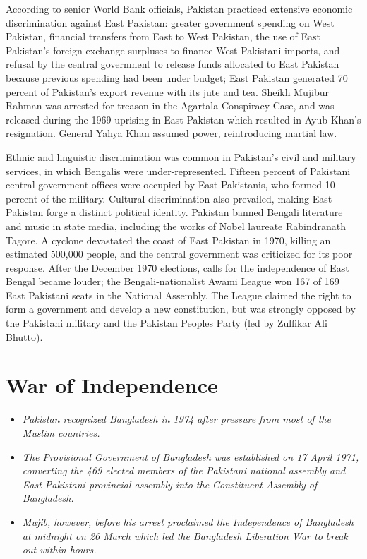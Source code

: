 According to senior World Bank officials, Pakistan practiced extensive
economic discrimination against East Pakistan: greater government
spending on West Pakistan, financial transfers from East to West
Pakistan, the use of East Pakistan's foreign-exchange surpluses to
finance West Pakistani imports, and refusal by the central government to
release funds allocated to East Pakistan because previous spending had
been under budget; East Pakistan generated 70 percent of Pakistan's
export revenue with its jute and tea. Sheikh Mujibur Rahman was arrested
for treason in the Agartala Conspiracy Case, and was released during the
1969 uprising in East Pakistan which resulted in Ayub Khan's
resignation. General Yahya Khan assumed power, reintroducing martial
law.

Ethnic and linguistic discrimination was common in Pakistan's civil and
military services, in which Bengalis were under-represented. Fifteen
percent of Pakistani central-government offices were occupied by East
Pakistanis, who formed 10 percent of the military. Cultural
discrimination also prevailed, making East Pakistan forge a distinct
political identity. Pakistan banned Bengali literature and music in
state media, including the works of Nobel laureate Rabindranath Tagore.
A cyclone devastated the coast of East Pakistan in 1970, killing an
estimated 500,000 people, and the central government was criticized for
its poor response. After the December 1970 elections, calls for the
independence of East Bengal became louder; the Bengali-nationalist Awami
League won 167 of 169 East Pakistani seats in the National Assembly. The
League claimed the right to form a government and develop a new
constitution, but was strongly opposed by the Pakistani military and the
Pakistan Peoples Party (led by Zulfikar Ali Bhutto).

\section{War of Independence}\label{war-of-independence}

\begin{itemize}
\item
  \emph{Pakistan recognized Bangladesh in 1974 after pressure from most
  of the Muslim countries.}
\item
  \emph{The Provisional Government of Bangladesh was established on 17
  April 1971, converting the 469 elected members of the Pakistani
  national assembly and East Pakistani provincial assembly into the
  Constituent Assembly of Bangladesh.}
\item
  \emph{Mujib, however, before his arrest proclaimed the Independence of
  Bangladesh at midnight on 26 March which led the Bangladesh Liberation
  War to break out within hours.}
\end{itemize}

